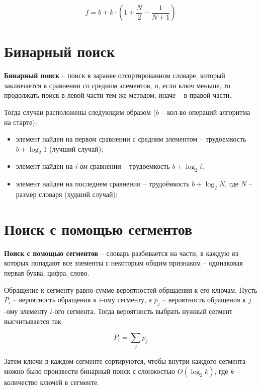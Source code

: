 \begin{equation}
	f = b + k \cdot \left(1 + \frac{N}{2} - \frac{1}{N + 1}\right)
\end{equation}


\section{Бинарный поиск}

\textbf{Бинарный поиск} \cite{search-bin} -- поиск в заранее отсортированном словаре, который заключается в сравнении со средним элементов, и, если ключ меньше, то продолжать поиск в левой части тем же методом, иначе -- в правой части.

Тогда случаи расположены следующим образом ($b$ -- кол-во операций алгоритма на старте):
\begin{itemize}
	\item элемент найден на первом сравнении с средним элементом -- трудоемкость $b + \log_2 1$ (лучший случай);
	\item элемент найден на \textit{i-ом} сравнении -- трудоемкость $b + \log_2 i$;
	\item элемент найден на последнем сравнении -- трудоёмкость $b +  \log_2 N$, где $N$ -- размер словаря (худший случай);
\end{itemize}



\section{Поиск с помощью сегментов}

\textbf{Поиск с помощью сегментов} \cite{search-segments} -- словарь разбивается на части, в каждую из которых попадают все элементы с некоторым общим признаком -- одинаковая первая буква, цифра, слово.

Обращение к сегменту равно сумме вероятностей обрщаения к его ключам. Пусть $P_i$ -- вероятность обращения к $i$-ому сегменту, а $p_j$ -- вероятность обращения к $j$-ому элементу $i$-ого сегмента. Тогда вероятность выбрать нужный сегмент высчитывается так 

\begin{equation}
	P_i = \sum_j p_j
\end{equation}

Затем ключи в каждом сегменте сортируются, чтобы внутри каждого сегмента можно было произвести бинарный поиск с слонжостью $O(\log_2 k)$, где $k$ -- количество ключей в сегменте.


